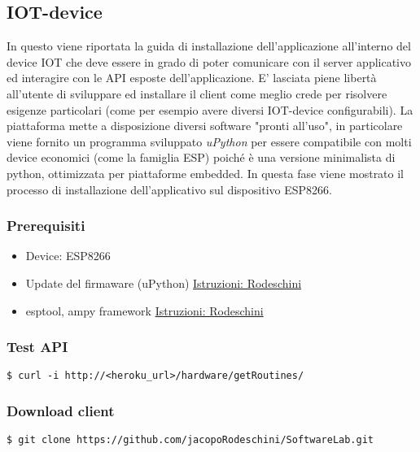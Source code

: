 \documentclass[onecolumn,a4paper]{article}
\begin{document}
\subsection{IOT-device}
\label{sec:orga40008d}
In questo viene riportata la guida di installazione dell'applicazione all'interno del device IOT che deve essere in grado di poter comunicare con il server applicativo ed interagire con le API esposte dell'applicazione. E' lasciata piene libertà all'utente di sviluppare ed installare il client come meglio crede per risolvere esigenze particolari (come per esempio avere diversi IOT-device configurabili). La piattaforma mette a disposizione diversi software "pronti all'uso", in particolare viene fornito un programma sviluppato \emph{uPython} per essere compatibile con molti device economici (come la famiglia ESP) poiché è una versione minimalista di python, ottimizzata per piattaforme embedded. In questa fase viene mostrato il processo di installazione dell'applicativo sul dispositivo ESP8266.

\subsubsection{Prerequisiti}
\label{sec:orgc44a045}
\begin{itemize}
\item Device: ESP8266
\item Update del firmaware (uPython) \href{https://github.com/jacopoRodeschini/ESP8266\_PY}{Istruzioni: Rodeschini}
\item esptool, ampy framework \href{https://github.com/jacopoRodeschini/ESP8266\_PY}{Istruzioni: Rodeschini}
\end{itemize}

\subsubsection{Test API}
\label{sec:orgb311316}
\begin{verbatim}
$ curl -i http://<heroku_url>/hardware/getRoutines/
\end{verbatim}

\subsubsection{Download client}
\label{sec:org1864f08}
\begin{verbatim}
$ git clone https://github.com/jacopoRodeschini/SoftwareLab.git
\end{verbatim}
\end{document}

